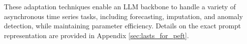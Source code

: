 These adaptation techniques enable an LLM backbone to handle a variety of asynchronous time series tasks, including forecasting, imputation, and anomaly detection, while maintaining parameter efficiency. Details on the exact prompt representation are provided in Appendix \ref{sec:lasts_for_peft}.






